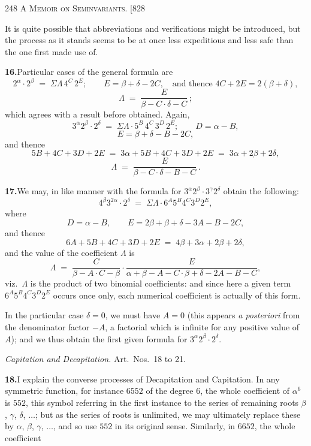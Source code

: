 \documentclass[11pt]{article}
\begin{document}
\newpage
\noindent\textsc{248 \hfill A Memoir on Seminvariants. \hfill [828}
\vspace{0.6em}

\noindent It is quite possible that abbreviations and verifications might be
introduced, but the process as it stands seems to be at once less expeditious and
less safe than the one first made use of.

\medskip
\noindent\textbf{16.}\quad Particular cases of the general formula are
\[
2^{\alpha}\cdot 2^{\beta} \;=\; \Sigma\Lambda\,4^{C}\,2^{E};\qquad E=\beta+\delta-2C,
\quad\text{and thence } 4C+2E=2(\beta+\delta),
\]
\[
\Lambda \;=\; \frac{E}{\beta-C\cdot \delta-C}\,;
\]
which agrees with a result before obtained. Again,
\[
3^{\alpha}2^{\beta}\cdot 2^{\delta} \;=\; \Sigma\Lambda\cdot 5^{B}\,4^{C}\,3^{D}\,2^{E};\qquad D=\alpha-B,
\]
\[
E = \beta+\delta-B-2C,
\]
and thence
\[
5B+4C+3D+2E \;=\; 3\alpha+5B+4C+3D+2E \;=\; 3\alpha+2\beta+2\delta,
\]
\[
\Lambda \;=\; \frac{E}{\beta-C\cdot \delta-B-C}\,.
\]

\medskip
\noindent\textbf{17.}\quad We may, in like manner with the formula for $3^{\alpha}2^{\beta}\cdot 3^{\gamma}2^{\delta}$
obtain the following:
\[
4^{\beta}3^{2\alpha}\cdot 2^{\delta} \;=\; \Sigma\Lambda\cdot 6^{A}5^{B}4^{C}3^{D}2^{E},
\]
where
\[
D = \alpha-B,\qquad E = 2\beta+\beta+\delta-3A-B-2C,
\]
and thence
\[
6A+5B+4C+3D+2E \;=\; 4\beta+3\alpha+2\beta+2\delta,
\]
and the value of the coefficient $\Lambda$ is
\[
\Lambda \;=\; \frac{C}{\beta-A\cdot C-\beta}\cdot \frac{E}{\alpha+\beta-A-C\cdot \beta+\delta-2A-B-C},
\]
viz.\ $\Lambda$ is the product of two binomial coefficients: and since here a given
term $6^{A}5^{B}4^{C}3^{D}2^{E}$ occurs once only, each numerical coefficient is actually
of this form.

\medskip
In the particular case $\delta=0$, we must have $A=0$ (this appears \textit{a posteriori}
from the denominator factor $-A$, a factorial which is infinite for any positive value
of $A$); and we thus obtain the first given formula for $3^{\alpha}2^{\beta}\cdot 2^{\delta}$.

\medskip
\begin{center}
\textit{Capitation and Decapitation.} \quad Art.\ Nos.\ 18 to 21.
\end{center}

\medskip
\noindent\textbf{18.}\quad I explain the converse processes of Decapitation and
Capitation. In any symmetric function, for instance $6552$ of the degree $6$, the
whole coefficient of $\alpha^{6}$ is $552$, this symbol referring in the first instance
to the series of remaining roots $\beta$, $\gamma$, $\delta$, $\ldots$; but as the
series of roots is unlimited, we may ultimately replace these by $\alpha$, $\beta$,
$\gamma$, $\ldots$, and so use $552$ in its original sense. Similarly, in $6652$, the
whole coefficient
\end{document}
